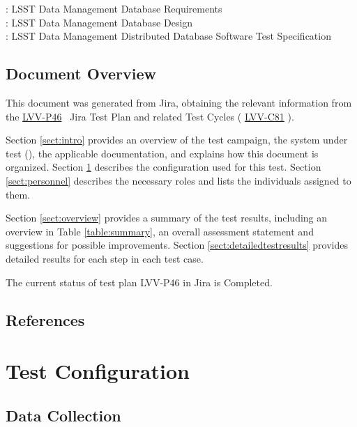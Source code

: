 \documentclass[DM,STR,toc]{lsstdoc}
\begin{document}
: LSST Data Management Database Requirements\\
: LSST Data Management Database Design\\
: LSST Data Management Distributed Database Software Test
Specification


\subsection{Document Overview}
\label{sect:docoverview}

This document was generated from Jira, obtaining the relevant information from the 
\href{https://jira.lsstcorp.org/secure/Tests.jspa#/testPlan/LVV-P46}{LVV-P46}
~Jira Test Plan and related Test Cycles (
  \href{https://jira.lsstcorp.org/secure/Tests.jspa#/testCycle/LVV-C81}{LVV-C81}
).

Section \ref{sect:intro} provides an overview of the test campaign, the system under test (\product{}), the applicable documentation, and explains how this document is organized.
Section \ref{sect:configuration}  describes the configuration used for this test.
Section \ref{sect:personnel} describes the necessary roles and lists the individuals assigned to them.

Section \ref{sect:overview} provides a summary of the test results, including an overview in Table \ref{table:summary}, an overall assessment statement and suggestions for possible improvements.
Section \ref{sect:detailedtestresults} provides detailed results for each step in each test case.

The current status of test plan LVV-P46 in Jira is Completed.

\subsection{References}
\label{sect:references}
\renewcommand{\refname}{}

\section{Test Configuration}
\label{sect:configuration}

\subsection{Data Collection}
\end{document}
